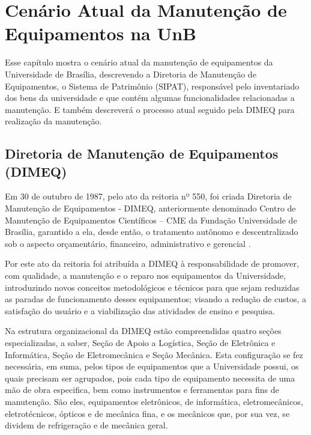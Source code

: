\chapter{Cenário Atual da Manutenção de Equipamentos na UnB}
\label{man-unb}

Esse capítulo mostra o cenário atual da manutenção de equipamentos da Universidade de Brasília, descrevendo a Diretoria de Manutenção de Equipamentos, o Sistema de Patrimônio (SIPAT), responsável pelo inventariado dos bens da universidade e que contém algumas funcionalidades relacionadas a manutenção. E também descreverá o processo atual seguido pela DIMEQ para realização da manutenção.


\section{Diretoria de Manutenção de Equipamentos (DIMEQ)}

Em 30 de outubro de 1987, pelo ato da reitoria nº 550, foi criada Diretoria de Manutenção de Equipamentos - DIMEQ, anteriormente denominado Centro de Manutenção de Equipamentos Científicos – CME da Fundação Universidade de Brasília, garantido a ela, desde então, o tratamento autônomo e descentralizado sob o aspecto orçamentário, financeiro, administrativo e gerencial \cite{dimeq}.

Por este ato da reitoria foi atribuída a DIMEQ à responsabilidade de promover, com qualidade, a manutenção e o reparo nos equipamentos da Universidade, introduzindo novos conceitos metodológicos e técnicos para que sejam reduzidas as paradas de funcionamento desses equipamentos; visando a redução de custos, a satisfação do usuário e a viabilização das atividades de ensino e pesquisa.

Na estrutura organizacional da DIMEQ estão compreendidas quatro seções especializadas, a saber, Seção de Apoio a Logística, Seção de Eletrônica e Informática, Seção de Eletromecânica e Seção Mecânica. Esta configuração se fez necessária, em suma, pelos tipos de equipamentos que a Universidade possui, os quais precisam ser agrupados, pois cada tipo de equipamento necessita de uma mão de obra especifica, bem como instrumentos e ferramentas para fins de manutenção. São eles, equipamentos eletrônicos, de informática, eletromecânicos, eletrotécnicos, ópticos e de mecânica fina, e os mecânicos que, por sua vez, se dividem de refrigeração e de mecânica geral.

